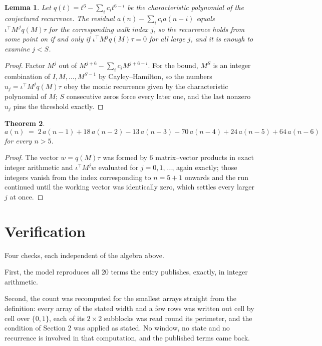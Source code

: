 \documentclass[11pt,a4paper]{article}
\theoremstyle{plain}
\newtheorem{theorem}{Theorem}
\newtheorem{lemma}[theorem]{Lemma}
\theoremstyle{definition}
\begin{document}
\begin{lemma}\label{lem:crit}
Let $q(t)=t^{6}-\sum_i c_it^{6-i}$ be the characteristic polynomial of the
conjectured recurrence. The residual $a(n)-\sum_ic_ia(n-i)$ equals
$\iota^{\!\top}M^{\,j}q(M)\tau$ for the corresponding walk index $j$, so the recurrence
holds from some point on if and only if $\iota^{\!\top}M^{j}q(M)\tau=0$ for all large $j$,
and it is enough to examine $j<S$.
\end{lemma}

\begin{proof}
Factor $M^{j}$ out of $M^{j+6}-\sum_ic_iM^{j+6-i}$. For the bound, $M^{S}$
is an integer combination of $I,M,\dots,M^{S-1}$ by Cayley--Hamilton, so the numbers
$u_j=\iota^{\!\top}M^{j}q(M)\tau$ obey the monic recurrence given by the characteristic
polynomial of $M$; $S$ consecutive zeros force every later one, and the last nonzero $u_j$
pins the threshold exactly.
\end{proof}

\begin{theorem}
\[
a(n)\;=\;2\,a(n-1) + 18\,a(n-2) - 13\,a(n-3) - 70\,a(n-4) + 24\,a(n-5) + 64\,a(n-6)
\]
for every $n>5$.
\end{theorem}

\begin{proof}
The vector $w=q(M)\tau$ was formed by $6$ matrix--vector products in exact integer
arithmetic and $\iota^{\!\top}M^{j}w$ evaluated for $j=0,1,\dots$, again exactly; those
integers vanish from the index corresponding to $n=5+1$ onwards and the run continued
until the working vector was identically zero, which settles every larger $j$ at once.
\end{proof}

\section{Verification}

Four checks, each independent of the algebra above.

First, the model reproduces all $20$ terms the entry publishes, exactly, in integer
arithmetic.

Second, the count was recomputed for the smallest arrays straight from the definition: every
array of the stated width and a few rows was written out cell by cell over $\{0,1\}$, each of
its $2\times2$ subblocks was read round its perimeter, and the condition of Section 2 was
applied as stated. No window, no state and no recurrence is involved in that computation, and
the published terms came back.
\end{document}
